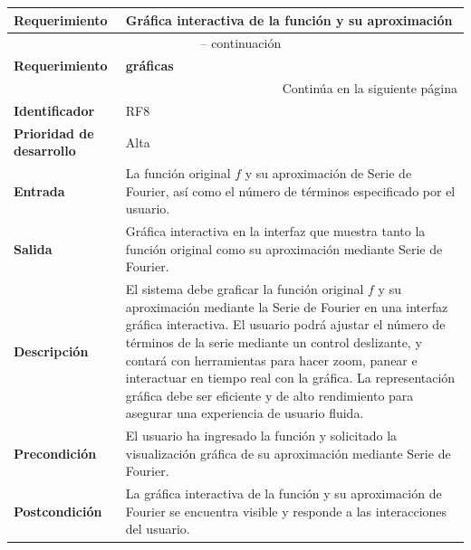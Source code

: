 \begin{longtable}{|m{3.5cm}|m{9.5cm}|}
	\hline
	\rowcolor{black!75} \color{white}\textbf{Requerimiento} & \color{white}\textbf{Gráfica interactiva de la función y su aproximación} \\
	\hline
	\endfirsthead
	\multicolumn{2}{c}{{\tablename\ \thetable{} -- continuación}} \\
	\hline
	\rowcolor{black!75} \color{white}\textbf{Requerimiento} & \color{white}\textbf{gráficas} \\
	\hline
	\endhead
	\hline \multicolumn{2}{r}{{Continúa en la siguiente página}} \\
	\endfoot
	\hline
	\endlastfoot
	
	\textbf{Identificador} & RF8 \\
	\hline
	\textbf{Prioridad de desarrollo} & Alta \\
	\hline
	\textbf{Entrada} & La función original \( f \) y su aproximación de Serie de Fourier, así como el número de términos especificado por el usuario. \\
	\hline
	\textbf{Salida} & Gráfica interactiva en la interfaz que muestra tanto la función original como su aproximación mediante Serie de Fourier. \\
	\hline
	\textbf{Descripción} & El sistema debe graficar la función original \( f \) y su aproximación mediante la Serie de Fourier en una interfaz gráfica interactiva. El usuario podrá ajustar el número de términos de la serie mediante un control deslizante, y contará con herramientas para hacer zoom, panear e interactuar en tiempo real con la gráfica. La representación gráfica debe ser eficiente y de alto rendimiento para asegurar una experiencia de usuario fluida. \\
	\hline
	\textbf{Precondición} & El usuario ha ingresado la función y solicitado la visualización gráfica de su aproximación mediante Serie de Fourier. \\
	\hline
	\textbf{Postcondición} & La gráfica interactiva de la función y su aproximación de Fourier se encuentra visible y responde a las interacciones del usuario. \\
	\hline
\end{longtable}
\caption{Requerimiento funcional No. 8} \label{tabla:RF8}
\vspace{0.5cm}

